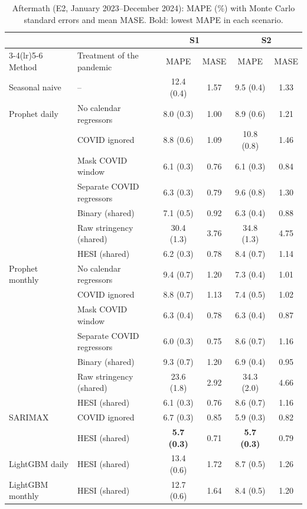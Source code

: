 \documentclass{article}
\theoremstyle{plain}
\theoremstyle{definition}
\theoremstyle{remark}
\begin{document}
\begin{table}[t]
\centering
\caption{Aftermath (E2, January 2023--December 2024): MAPE (\%) with Monte Carlo standard errors and mean MASE. Bold: lowest MAPE in each scenario.}
\label{tab:e2}
\footnotesize
\begin{tabular}{llcccc}
\toprule
 & & \multicolumn{2}{c}{S1} & \multicolumn{2}{c}{S2} \\
\cmidrule(lr){3-4}\cmidrule(lr){5-6}
Method & Treatment of the pandemic & MAPE & MASE & MAPE & MASE \\
\midrule
Seasonal naive & -- & 12.4 (0.4) & 1.57 & 9.5 (0.4) & 1.33 \\
\addlinespace
Prophet daily & No calendar regressors & 8.0 (0.3) & 1.00 & 8.9 (0.6) & 1.21 \\
 & COVID ignored & 8.8 (0.6) & 1.09 & 10.8 (0.8) & 1.46 \\
 & Mask COVID window & 6.1 (0.3) & 0.76 & 6.1 (0.3) & 0.84 \\
 & Separate COVID regressors & 6.3 (0.3) & 0.79 & 9.6 (0.8) & 1.30 \\
 & Binary (shared) & 7.1 (0.5) & 0.92 & 6.3 (0.4) & 0.88 \\
 & Raw stringency (shared) & 30.4 (1.3) & 3.76 & 34.8 (1.3) & 4.75 \\
 & HESI (shared) & 6.2 (0.3) & 0.78 & 8.4 (0.7) & 1.14 \\
\addlinespace
Prophet monthly & No calendar regressors & 9.4 (0.7) & 1.20 & 7.3 (0.4) & 1.01 \\
 & COVID ignored & 8.8 (0.7) & 1.13 & 7.4 (0.5) & 1.02 \\
 & Mask COVID window & 6.3 (0.4) & 0.78 & 6.3 (0.4) & 0.87 \\
 & Separate COVID regressors & 6.0 (0.3) & 0.75 & 8.6 (0.7) & 1.16 \\
 & Binary (shared) & 9.3 (0.7) & 1.20 & 6.9 (0.4) & 0.95 \\
 & Raw stringency (shared) & 23.6 (1.8) & 2.92 & 34.3 (2.0) & 4.66 \\
 & HESI (shared) & 6.1 (0.3) & 0.76 & 8.6 (0.7) & 1.16 \\
\addlinespace
SARIMAX & COVID ignored & 6.7 (0.3) & 0.85 & 5.9 (0.3) & 0.82 \\
 & HESI (shared) & \textbf{5.7 (0.3)} & 0.71 & \textbf{5.7 (0.3)} & 0.79 \\
\addlinespace
LightGBM daily & HESI (shared) & 13.4 (0.6) & 1.72 & 8.7 (0.5) & 1.26 \\
\addlinespace
LightGBM monthly & HESI (shared) & 12.7 (0.6) & 1.64 & 8.4 (0.5) & 1.20 \\
\bottomrule
\end{tabular}
\end{table}
\end{document}

